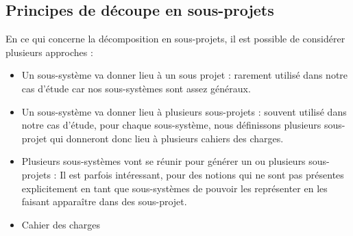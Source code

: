 \subsection{Principes de découpe en sous-projets}
En ce qui concerne la décomposition en sous-projets, il est possible de considérer plusieurs approches :

\begin{itemize}
\item Un sous-système va donner lieu à un sous projet : rarement utilisé dans notre cas d'étude car nos sous-systèmes sont assez généraux.
\item Un sous-système va donner lieu à plusieurs sous-projets : souvent utilisé dans notre cas d'étude, pour chaque sous-système, nous définissons plusieurs sous-projet qui donneront donc lieu à plusieurs cahiers des charges.
\item Plusieurs sous-systèmes vont se réunir pour générer un ou plusieurs sous-projets : Il est parfois intéressant, pour des notions qui ne sont pas présentes explicitement en tant que sous-systèmes de pouvoir les représenter en les faisant apparaître dans des sous-projet.
\item Cahier des charges
\end{itemize}


